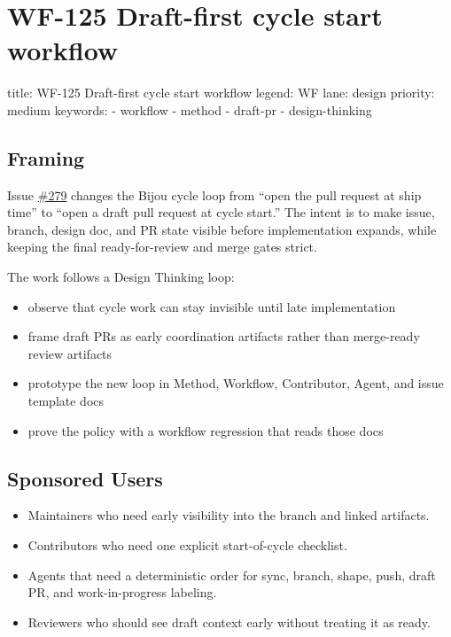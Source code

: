 \chapter{WF-125 Draft-first cycle start workflow}\label{record-208}

\smallskip

\begin{RecordMeta}
title: WF-125 Draft-first cycle start workflow
legend: WF
lane: design
priority: medium
keywords:
  - workflow
  - method
  - draft-pr
  - design-thinking

\end{RecordMeta}

\section{Framing}\label{record-208-framing}

Issue \href{https://github.com/flyingrobots/bijou/issues/279}{\#279} changes the Bijou cycle loop from ``open the pull request at ship time'' to ``open a draft pull request at cycle start.'' The intent is to make issue, branch, design doc, and PR state visible before implementation expands, while keeping the final ready-for-review and merge gates strict.

The work follows a Design Thinking loop:

\begin{itemize}
\tightlist
\item
  observe that cycle work can stay invisible until late implementation
\item
  frame draft PRs as early coordination artifacts rather than merge-ready review artifacts
\item
  prototype the new loop in Method, Workflow, Contributor, Agent, and issue template docs
\item
  prove the policy with a workflow regression that reads those docs
\end{itemize}

\section{Sponsored Users}\label{record-208-sponsored-users}

\begin{itemize}
\tightlist
\item
  Maintainers who need early visibility into the branch and linked artifacts.
\item
  Contributors who need one explicit start-of-cycle checklist.
\item
  Agents that need a deterministic order for sync, branch, shape, push, draft PR, and work-in-progress labeling.
\item
  Reviewers who should see draft context early without treating it as ready.
\end{itemize}

